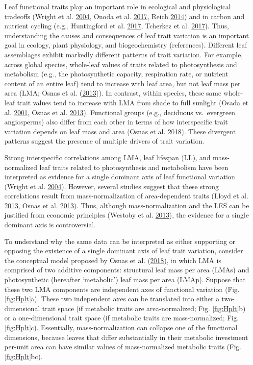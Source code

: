 \documentclass[
  12pt,
]{article}
\begin{document}
Leaf functional traits play an important role in ecological and physiological tradeoffs (Wright et al. \protect\hyperlink{ref-Wright2004a}{2004}, Onoda et al. \protect\hyperlink{ref-Onoda2017}{2017}, Reich \protect\hyperlink{ref-Reich2014}{2014}) and in carbon and nutrient cycling (e.g., Huntingford et al. \protect\hyperlink{ref-Huntingford2017}{2017}, Tcherkez et al. \protect\hyperlink{ref-Tcherkez2017}{2017}).
Thus, understanding the causes and consequences of leaf trait variation is an important goal in ecology, plant physiology, and biogeochemistry (references).
Different leaf assemblages exhibit markedly different patterns of trait variation.
For example, across global species, whole-leaf values of traits related to photosynthesis and metabolism (e.g., the photosynthetic capacity, respiration rate, or nutrient content of an entire leaf) tend to increase with leaf area, but not leaf mass per area (LMA; Osnas et al. (\protect\hyperlink{ref-Osnas2013}{2013})). In contrast, within species, these same whole-leaf trait values tend to increase with LMA from shade to full sunlight (Osada et al. \protect\hyperlink{ref-Osada2001}{2001}, Osnas et al. \protect\hyperlink{ref-Osnas2013}{2013}).
Functional groups (e.g., deciduous vs.~evergreen angiosperms) also differ from each other in terms of how interspecific trait variation depends on leaf mass and area (Osnas et al. \protect\hyperlink{ref-Osnas2018}{2018}).
These divergent patterns suggest the presence of multiple drivers of trait variation.

Strong interspecific correlations among LMA, leaf lifespan (LL), and mass-normalized leaf traits related to photosynthesis and metabolism have been interpreted as evidence for a single dominant axis of leaf functional variation (Wright et al. \protect\hyperlink{ref-Wright2004a}{2004}).
However, several studies suggest that these strong correlations result from mass-normalization of area-dependent traits (Lloyd et al. \protect\hyperlink{ref-Lloyd2013}{2013}, Osnas et al. \protect\hyperlink{ref-Osnas2013}{2013}).
Thus, although mass-normalization and the LES can be justified from economic principles (Westoby et al. \protect\hyperlink{ref-Westoby2013}{2013}), the evidence for a single dominant axis is controversial.

To understand why the same data can be interpreted as either supporting or opposing the existence of a single dominant axis of leaf trait variation, consider the conceptual model proposed by Osnas et al. (\protect\hyperlink{ref-Osnas2018}{2018}), in which LMA is comprised of two additive components: structural leaf mass per area (LMAs) and photosynthetic (hereafter `metabolic') leaf mass per area (LMAp).
Suppose that these two LMA components are independent axes of functional variation (Fig. \ref{fig:Hplt}a).
These two independent axes can be translated into either a two-dimensional trait space (if metabolic traits are area-normalized; Fig. \ref{fig:Hplt}b) or a one-dimensional trait space (if metabolic traits are mass-normalized; Fig. \ref{fig:Hplt}c).
Essentially, mass-normalization can collapse one of the functional dimensions, because leaves that differ substantially in their metabolic investment per-unit area can have similar values of mass-normalized metabolic traits (Fig. \ref{fig:Hplt}bc).
\end{document}
